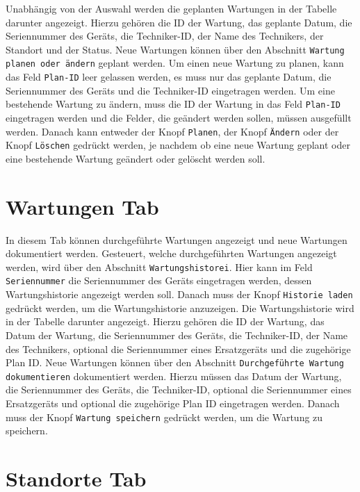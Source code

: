 \documentclass[11pt,a4paper]{article}
\begin{document}
Unabhängig von der Auswahl werden die geplanten Wartungen in der Tabelle darunter angezeigt. Hierzu gehören die ID der Wartung, das geplante Datum, die Seriennummer des Geräts,
die Techniker-ID, der Name des Technikers, der Standort und der Status.
Neue Wartungen können über den Abschnitt {\texttt{Wartung planen oder ändern}} geplant werden.
Um einen neue Wartung zu planen, kann das Feld {\texttt{Plan-ID}} leer gelassen werden, es muss nur das geplante Datum, die Seriennummer des Geräts und die Techniker-ID eingetragen werden.
Um eine bestehende Wartung zu ändern, muss die ID der Wartung in das Feld {\texttt{Plan-ID}} eingetragen werden und die Felder, die geändert werden sollen, müssen ausgefüllt werden.
Danach kann entweder der Knopf {\texttt{Planen}}, der Knopf {\texttt{Ändern}} oder der Knopf {\texttt{Löschen}} gedrückt werden, je nachdem ob eine neue Wartung geplant oder eine bestehende 
Wartung geändert oder gelöscht werden soll. 

\section{Wartungen Tab}

In diesem Tab können durchgeführte Wartungen angezeigt und neue Wartungen dokumentiert werden.
Gesteuert, welche durchgeführten Wartungen angezeigt werden, wird über den Abschnitt {\texttt{Wartungshistorei}}.
Hier kann im Feld {\texttt{Seriennummer}} die Seriennummer des Geräts eingetragen werden, dessen Wartungshistorie angezeigt werden soll.
Danach muss der Knopf {\texttt{Historie laden}} gedrückt werden, um die Wartungshistorie anzuzeigen. Die Wartungshistorie wird in 
der Tabelle darunter angezeigt. Hierzu gehören die ID der Wartung, das Datum der Wartung, die Seriennummer des Geräts, die Techniker-ID, der
Name des Technikers, optional die Seriennummer eines Ersatzgeräts und die zugehörige Plan ID.
Neue Wartungen können über den Abschnitt {\texttt{Durchgeführte Wartung dokumentieren}} dokumentiert werden. 
Hierzu müssen das Datum der Wartung, die Seriennummer des Geräts, die Techniker-ID, optional die Seriennummer eines Ersatzgeräts und optional die zugehörige Plan ID eingetragen werden.
Danach muss der Knopf {\texttt{Wartung speichern}} gedrückt werden, um die Wartung zu speichern.

\section{Standorte Tab}
\end{document}
